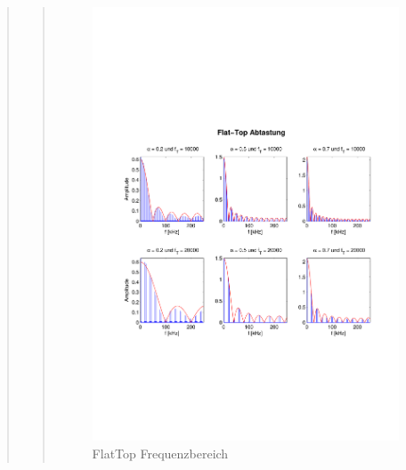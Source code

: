 \begin{quote}
\begin{quote}
        
        \begin{figure}[H]
            \centering
            \hspace{-3em}
            \includegraphics[scale=0.8, trim = 2cm 7cm 1cm 8cm, clip]{Bilder/FlatTop_freq}
            \caption{FlatTop Frequenzbereich}
            \label{fig:FlatTop_freq}
        \end{figure}
        
        
        

\end{quote}
\end{quote}

